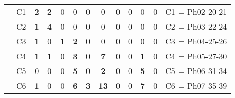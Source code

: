 \begin{table}[H]
{\begin{tabular}{|ccccccccccccc|}
\multicolumn{1}{|c|}{}                                      & \multicolumn{1}{c|}{C1} & \multicolumn{1}{c|}{\textbf{2}} & \multicolumn{1}{c|}{\textbf{2}} & \multicolumn{1}{c|}{0}          & \multicolumn{1}{c|}{0}          & \multicolumn{1}{c|}{0}          & \multicolumn{1}{c|}{0}           & \multicolumn{1}{c|}{0}          & \multicolumn{1}{c|}{0}  & \multicolumn{1}{c|}{0}           & \multicolumn{1}{c|}{0}          & C1 = Ph02-20-21   \\ \cline{2-13}
\multicolumn{1}{|c|}{}                                      & \multicolumn{1}{c|}{C2} & \multicolumn{1}{c|}{\textbf{1}} & \multicolumn{1}{c|}{\textbf{4}} & \multicolumn{1}{c|}{0}          & \multicolumn{1}{c|}{0}          & \multicolumn{1}{c|}{0}          & \multicolumn{1}{c|}{0}           & \multicolumn{1}{c|}{0}          & \multicolumn{1}{c|}{0}  & \multicolumn{1}{c|}{0}           & \multicolumn{1}{c|}{0}          & C2 = Ph03-22-24   \\ \cline{2-13}
\multicolumn{1}{|c|}{}                                      & \multicolumn{1}{c|}{C3} & \multicolumn{1}{c|}{\textbf{1}} & \multicolumn{1}{c|}{0}          & \multicolumn{1}{c|}{\textbf{1}} & \multicolumn{1}{c|}{\textbf{2}} & \multicolumn{1}{c|}{0}          & \multicolumn{1}{c|}{0}           & \multicolumn{1}{c|}{0}          & \multicolumn{1}{c|}{0}  & \multicolumn{1}{c|}{0}           & \multicolumn{1}{c|}{0}          & C3 = Ph04-25-26   \\ \cline{2-13}
\multicolumn{1}{|c|}{}                                      & \multicolumn{1}{c|}{C4} & \multicolumn{1}{c|}{\textbf{1}} & \multicolumn{1}{c|}{\textbf{1}} & \multicolumn{1}{c|}{0}          & \multicolumn{1}{c|}{\textbf{3}} & \multicolumn{1}{c|}{0}          & \multicolumn{1}{c|}{\textbf{7}}  & \multicolumn{1}{c|}{0}          & \multicolumn{1}{c|}{0}  & \multicolumn{1}{c|}{\textbf{1}}  & \multicolumn{1}{c|}{0}          & C4 = Ph05-27-30   \\ \cline{2-13}
\multicolumn{1}{|c|}{}                                      & \multicolumn{1}{c|}{C5} & \multicolumn{1}{c|}{0}          & \multicolumn{1}{c|}{0}          & \multicolumn{1}{c|}{0}          & \multicolumn{1}{c|}{\textbf{5}} & \multicolumn{1}{c|}{0}          & \multicolumn{1}{c|}{\textbf{2}}  & \multicolumn{1}{c|}{0}          & \multicolumn{1}{c|}{0}  & \multicolumn{1}{c|}{\textbf{5}}  & \multicolumn{1}{c|}{0}          & C5 = Ph06-31-34   \\ \cline{2-13}
\multicolumn{1}{|c|}{}                                      & \multicolumn{1}{c|}{C6} & \multicolumn{1}{c|}{\textbf{1}} & \multicolumn{1}{c|}{0}          & \multicolumn{1}{c|}{0}          & \multicolumn{1}{c|}{\textbf{6}} & \multicolumn{1}{c|}{\textbf{3}} & \multicolumn{1}{c|}{\textbf{13}} & \multicolumn{1}{c|}{0}          & \multicolumn{1}{c|}{0}  & \multicolumn{1}{c|}{\textbf{7}}  & \multicolumn{1}{c|}{0}          & C6 = Ph07-35-39   \\ \cline{2-13}

\end{tabular}}
\end{table}
